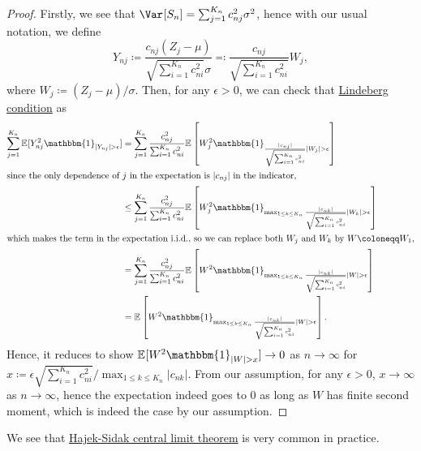 \begin{proof}
	Firstly, we see that \(\Var_{}[S_n] = \sum_{j=1}^{K_n} c_{nj}^2 \sigma ^2\), hence with our usual notation, we define
	\[
		Y_{nj}
		\coloneqq \frac{c_{nj} (Z_j - \mu )}{\sqrt{\sum_{i=1}^{K_n} c_{ni}^2} \sigma }
		\eqqcolon \frac{c_{nj}}{\sqrt{\sum_{i=1}^{K_n} c_{ni}^2} } W_j,
	\]
	where \(W_j \coloneqq (Z_j - \mu ) / \sigma \). Then, for any \(\epsilon > 0\), we can check that \hyperref[def:Lindeberg-condition]{Lindeberg condition} as
	\begin{align*}
		\sum_{j=1}^{K_n} \mathbb{E}_{}[Y_{nj}^2 \mathbbm{1}_{\vert Y_{nj} \vert > \epsilon } ]
		 & = \sum_{j=1}^{K_n} \frac{c_{nj}^2}{\sum_{i=1}^{K_n} c_{ni}^2} \mathbb{E}_{}\left[ W_j^2 \mathbbm{1}_{\frac{\vert c_{nj} \vert }{\sqrt{\sum_{i=1}^{K_n} c_{ni}^2} } \vert W_j \vert > \epsilon } \right]                               \\
		\shortintertext{since the only dependence of \(j\) in the expectation is \(\vert c_{nj} \vert \) in the indicator,}
		 & \leq \sum_{j=1}^{K_n} \frac{c_{nj}^2}{\sum_{i=1}^{K_n} c_{ni}^2} \mathbb{E}_{}\left[ W_j^2 \mathbbm{1}_{ \max _{1 \leq k \leq K_n} \frac{\vert c_{nk} \vert }{\sqrt{\sum_{i=1}^{K_n} c_{ni}^2} } \vert W_k \vert > \epsilon } \right] \\
		\shortintertext{which makes the term in the expectation i.i.d., so we can replace both \(W_j\) and \(W_k\) by \(W \coloneqq W_1\),}
		 & = \sum_{j=1}^{K_n} \frac{c_{nj}^2}{\sum_{i=1}^{K_n} c_{ni}^2} \mathbb{E}_{}\left[ W^2 \mathbbm{1}_{ \max _{1 \leq k \leq K_n} \frac{\vert c_{nk} \vert }{\sqrt{\sum_{i=1}^{K_n} c_{ni}^2} } \vert W \vert > \epsilon } \right]        \\
		 & = \mathbb{E}_{}\left[ W^2 \mathbbm{1}_{ \max _{1 \leq k \leq K_n} \frac{\vert c_{nk} \vert }{\sqrt{\sum_{i=1}^{K_n} c_{ni}^2} } \vert W \vert > \epsilon } \right] .
	\end{align*}
	Hence, it reduces to show \(\mathbb{E}_{}[ W^2 \mathbbm{1}_{\vert W \vert > x} ] \to 0\) as \(n \to \infty \) for \(x \coloneqq \epsilon \sqrt{\sum_{i=1}^{K_n} c_{ni}^2} / \max _{1 \leq k \leq K_n} \vert c_{nk} \vert \). From our assumption, for any \(\epsilon > 0\), \(x \to \infty \) as \(n \to \infty \), hence the expectation indeed goes to \(0\) as long as \(W\) has finite second moment, which is indeed the case by our assumption.
\end{proof}

We see that \hyperref[thm:Hajek-Sidak-CLT]{Hajek-Sidak central limit theorem} is very common in practice.

